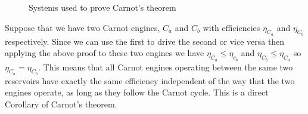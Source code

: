 \begin{figure}[ht]
        \caption{Systems used to prove Carnot's theorem}
    \end{figure}
    
    Suppose that we have two Carnot engines, \(C_a\) and \(C_b\) with efficiencies \(\eta_{C_a}\) and \(\eta_{C_b}\) respectively.
    Since we can use the first to drive the second or vice versa then applying the above proof to these two engines we have \(\eta_{C_a}\le \eta_{c_b}\) and \(\eta_{C_b}\le\eta_{C_a}\) so \(\eta_{C_a} = \eta_{C_b}\).
    This means that all Carnot engines operating between the same two reservoirs have exactly the same efficiency independent of the way that the two engines operate, as long as they follow the Carnot cycle.
    This is a direct Corollary of Carnot's theorem.
    
